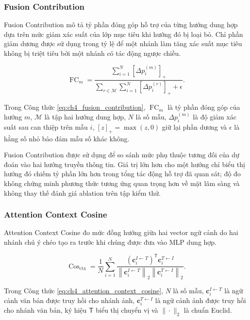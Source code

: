 \subsubsection{Fusion Contribution}

Fusion Contribution mô tả tỷ phần đóng góp hỗ trợ của từng hướng dung hợp dựa trên mức giảm xác suất của lớp mục tiêu khi hướng đó bị loại bỏ. Chỉ phần giảm dương được sử dụng trong tỷ lệ để một nhánh làm tăng xác suất mục tiêu không bị triệt tiêu bởi một nhánh có tác động ngược chiều.

\begin{equation}\operatorname{FC}_{m}=\frac{\sum_{i=1}^{N}\left[\Delta p_i^{(m)}\right]_{+}}{\sum_{r\in\mathcal{M}}\sum_{i=1}^{N}\left[\Delta p_i^{(r)}\right]_{+}+\epsilon}.\label{eq:ch4_fusion_contribution}\end{equation}

Trong Công thức \ref{eq:ch4_fusion_contribution}, $\operatorname{FC}_{m}$ là tỷ phần đóng góp của hướng $m$, $\mathcal{M}$ là tập hai hướng dung hợp, $N$ là số mẫu, $\Delta p_i^{(m)}$ là độ giảm xác suất sau can thiệp trên mẫu $i$, $[z]_{+}=\max(z,0)$ giữ lại phần dương và $\epsilon$ là hằng số nhỏ bảo đảm mẫu số khác không.

Fusion Contribution được sử dụng để so sánh mức phụ thuộc tương đối của dự đoán vào hai hướng truyền thông tin. Giá trị lớn hơn cho một hướng chỉ biểu thị hướng đó chiếm tỷ phần lớn hơn trong tổng tác động hỗ trợ đã quan sát; độ đo không chứng minh phương thức tương ứng quan trọng hơn về mặt lâm sàng và không thay thế đánh giá ablation trên tập kiểm thử.

\subsubsection{Attention Context Cosine}

Attention Context Cosine đo mức đồng hướng giữa hai vector ngữ cảnh do hai nhánh chú ý chéo tạo ra trước khi chúng được đưa vào MLP dung hợp.

\begin{equation}\operatorname{Cos}_{\mathrm{ctx}}=\frac{1}{N}\sum_{i=1}^{N}\frac{\left(\boldsymbol{c}_{i}^{I\leftarrow T}\right)^{\mathsf{T}}\boldsymbol{c}_{i}^{T\leftarrow I}}{\left\|\boldsymbol{c}_{i}^{I\leftarrow T}\right\|_{2}\left\|\boldsymbol{c}_{i}^{T\leftarrow I}\right\|_{2}}.\label{eq:ch4_attention_context_cosine}\end{equation}

Trong Công thức \ref{eq:ch4_attention_context_cosine}, $N$ là số mẫu, $\boldsymbol{c}_{i}^{I\leftarrow T}$ là ngữ cảnh văn bản được truy hồi cho nhánh ảnh, $\boldsymbol{c}_{i}^{T\leftarrow I}$ là ngữ cảnh ảnh được truy hồi cho nhánh văn bản, ký hiệu $\mathsf{T}$ biểu thị chuyển vị và $\|\cdot\|_2$ là chuẩn Euclid.

